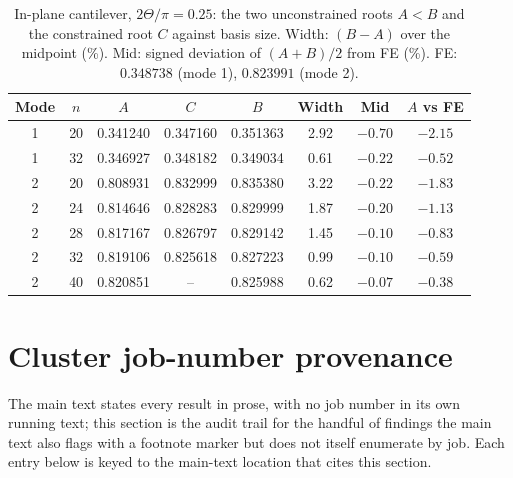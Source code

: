 \documentclass[11pt]{article}
\begin{document}
\begin{table}[!htbp]\centering\scriptsize
\setlength{\tabcolsep}{4pt}
\caption{In-plane cantilever, $2\Theta/\pi=0.25$: the two unconstrained
roots $A<B$ and the constrained root $C$ against basis size. Width:
$(B-A)$ over the midpoint (\%). Mid: signed deviation of $(A+B)/2$ from
FE (\%). FE: $0.348738$ (mode 1), $0.823991$ (mode 2).}
\label{tab:cantilever-split}
\begin{tabular}{cccccccc}
\toprule Mode & $n$ & $A$ & $C$ & $B$ & Width & Mid & $A$ vs FE\\ \midrule
1 & 20 & 0.341240 & 0.347160 & 0.351363 & 2.92 & $-0.70$ & $-2.15$\\
1 & 32 & 0.346927 & 0.348182 & 0.349034 & 0.61 & $-0.22$ & $-0.52$\\
2 & 20 & 0.808931 & 0.832999 & 0.835380 & 3.22 & $-0.22$ & $-1.83$\\
2 & 24 & 0.814646 & 0.828283 & 0.829999 & 1.87 & $-0.20$ & $-1.13$\\
2 & 28 & 0.817167 & 0.826797 & 0.829142 & 1.45 & $-0.10$ & $-0.83$\\
2 & 32 & 0.819106 & 0.825618 & 0.827223 & 0.99 & $-0.10$ & $-0.59$\\
2 & 40 & 0.820851 & -- & 0.825988 & 0.62 & $-0.07$ & $-0.38$\\
\bottomrule
\end{tabular}
\end{table}

\section{Cluster job-number provenance}\label{sec:provenance}
The main text states every result in prose, with no job number in its own
running text; this section is the audit trail for the handful of findings
the main text also flags with a footnote marker but does not itself
enumerate by job. Each entry below is keyed to the main-text location
that cites this section.
\end{document}
